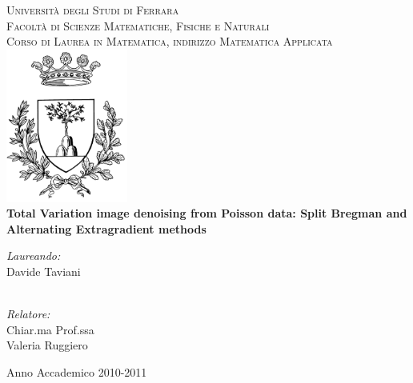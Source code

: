 \begin{titlepage}
\begin{center}


\textsc{\LARGE Universit\`{a} degli Studi di Ferrara}\\[1cm]

\textsc{Facolt\`{a} di Scienze Matematiche, Fisiche e Naturali}\\
\textsc{Corso di Laurea in Matematica, indirizzo Matematica Applicata}\\[1.5cm]

\includegraphics[width=4cm]{unife}\\[1cm]

\Large \textbf{Total Variation image denoising from Poisson data: Split Bregman and Alternating Extragradient methods} \\[0.5cm]


\vfill

\begin{minipage}{0.4\textwidth}
\begin{flushleft} \large
\emph{Laureando:}\\
Davide Taviani \\
~
\end{flushleft}
\end{minipage}
\begin{minipage}{0.4\textwidth}
\begin{flushright} \large
\emph{Relatore:} \\
Chiar.ma Prof.ssa \\
Valeria Ruggiero
\end{flushright}
\end{minipage}

\vspace{3cm}

{\large Anno Accademico 2010-2011}

\end{center}

\end{titlepage} 